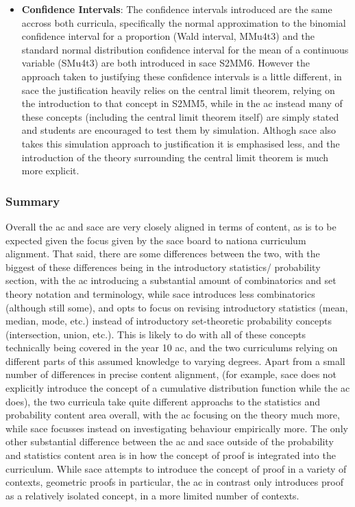\documentclass[twoside,12pt,a4paper]{report}
\begin{document}
\begin{itemize}
	\item \textbf{Confidence Intervals}: The confidence intervals introduced are the same accross both curricula, specifically the normal approximation to the binomial confidence interval for a proportion (Wald interval, MMu4t3) and the standard normal distribution confidence interval for the mean of a continuous variable (SMu4t3) are both introduced in \gls{sace} S2MM6. However the approach taken to justifying these confidence intervals is a little different, in \gls{sace} the justification heavily relies on the central limit theorem, relying on the introduction to that concept in S2MM5, while in the \gls{ac} instead many of these concepts (including the central limit theorem itself) are simply stated and students are encouraged to test them by simulation. Althogh \gls{sace} also takes this simulation approach to justification it is emphasised less, and the introduction of the theory surrounding the central limit theorem is much more explicit.
\end{itemize}



\subsubsection{Summary}

Overall the \gls{ac} and \gls{sace} are very closely aligned in terms of content, as is to be expected given the focus given by the \gls{sace} board to nationa curriculum alignment. That said, there are some differences between the two, with the biggest of these differences being in the introductory statistics/ probability section, with the \gls{ac} introducing a substantial amount of combinatorics and set theory notation and terminology, while \gls{sace} introduces less combinatorics (although still some), and opts to focus on revising introductory statistics (mean, median, mode, etc.) instead of introductory set-theoretic probability concepts (intersection, union, etc.). This is likely to do with all of these concepts technically being covered in the year 10 \gls{ac}, and the two curriculums relying on different parts of this assumed knowledge to varying degrees. Apart from a small number of differences in precise content alignment, (for example, \gls{sace} does not explicitly introduce the concept of a cumulative distribution function while the \gls{ac} does), the two curricula take quite different approachs to the statistics and probability content area overall, with the \gls{ac} focusing on the theory much more, while \gls{sace} focusses instead on investigating behaviour empirically more. The only other substantial difference between the \gls{ac} and \gls{sace} outside of the probability and statistics content area is in how the concept of proof is integrated into the curriculum. While \gls{sace} attempts to introduce the concept of proof in a variety of contexts, geometric proofs in particular, the \gls{ac} in contrast only introduces proof as a relatively isolated concept, in a more limited number of contexts.
\end{document}
